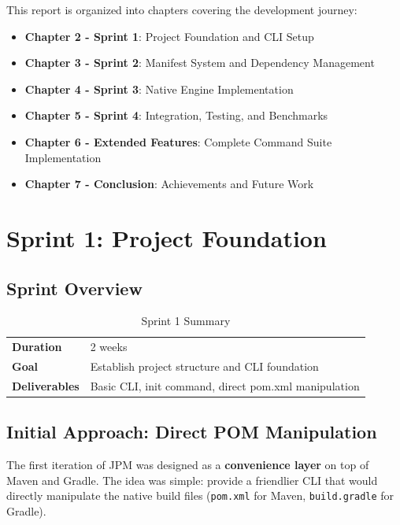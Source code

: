 \documentclass[12pt,a4paper]{report}
\begin{document}
This report is organized into chapters covering the development journey:

\begin{itemize}
    \item \textbf{Chapter 2 - Sprint 1}: Project Foundation and CLI Setup
    \item \textbf{Chapter 3 - Sprint 2}: Manifest System and Dependency Management
    \item \textbf{Chapter 4 - Sprint 3}: Native Engine Implementation
    \item \textbf{Chapter 5 - Sprint 4}: Integration, Testing, and Benchmarks
    \item \textbf{Chapter 6 - Extended Features}: Complete Command Suite Implementation
    \item \textbf{Chapter 7 - Conclusion}: Achievements and Future Work
\end{itemize}

\newpage

\chapter{Sprint 1: Project Foundation}

\section{Sprint Overview}

\begin{table}[H]
\centering
\begin{tabular}{ll}
\toprule
\textbf{Duration} & 2 weeks \\
\textbf{Goal} & Establish project structure and CLI foundation \\
\textbf{Deliverables} & Basic CLI, init command, direct pom.xml manipulation \\
\bottomrule
\end{tabular}
\caption{Sprint 1 Summary}
\end{table}

\section{Initial Approach: Direct POM Manipulation}

The first iteration of JPM was designed as a \textbf{convenience layer} on top of Maven and Gradle. The idea was simple: provide a friendlier CLI that would directly manipulate the native build files (\texttt{pom.xml} for Maven, \texttt{build.gradle} for Gradle).
\end{document}

